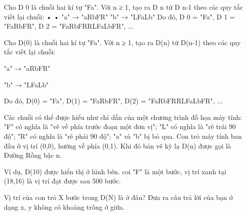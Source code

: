 Cho D 0 là chuỗi hai kí tự "Fa". Với n ≥ 1, tạo ra D n từ D n-1 theo các quy tắc viết lại chuỗi:       •       •       "a" → "aRbFR"       "b" → "LFaLb"       Do đó, D 0 = "Fa", D 1 = "FaRbFR", D 2 = "FaRbFRRLFaLbFR", ...    

   Cho D(0) là chuỗi hai kí tự "Fa". Với n ≥ 1, tạo ra D(n) từ D(n-1) theo các quy tắc viết lại chuỗi:  

   "a" → "aRbFR"  

   "b" → "LFaLb"  

   Do đó, D(0) = "Fa", D(1) = "FaRbFR", D(2) = "FaRbFRRLFaLbFR", ...  

   Các chuỗi có thể được hiểu như chỉ dẫn của một chương trình đồ họa máy tính: "F" có nghĩa là "vẽ về phía trước đoạn một đơn vị"; "L" có nghĩa là "rẽ trái 90 độ"; "R" có nghĩa là "rẽ phải 90 độ"; "a" và "b" bị bỏ qua. Con trỏ máy tính ban đầu ở vị trí (0,0), hướng về phía (0,1). Khi đó bản vẽ kỳ lạ D(n) được gọi là Đường Rồng bậc n.  

   Ví dụ, D(10) được hiển thị ở hình bên. coi "F" là một bước, vị trí xanh tại (18,16) là vị trí đạt được sau 500 bước.  

   Vị trí của con trỏ X bước trong D(N) là ở đâu? Đưa ra câu trả lời của bạn ở dạng x, y không có khoảng trống ở giữa.